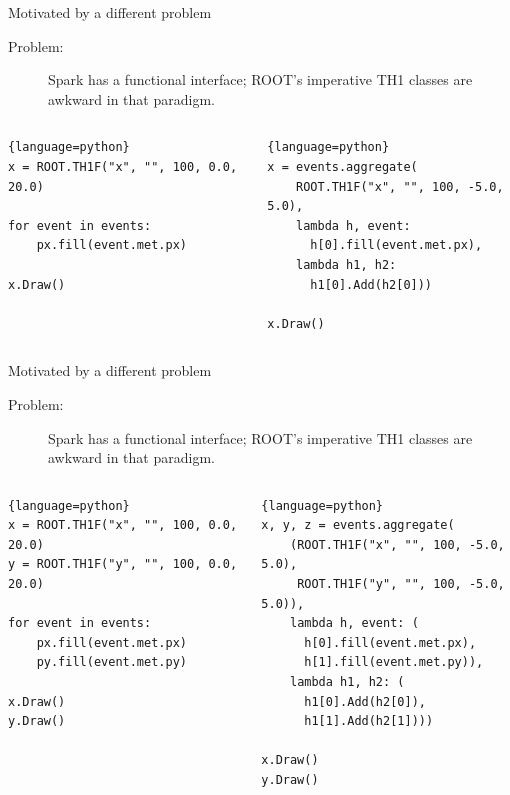 \documentclass{beamer}
\begin{document}



\begin{frame}[fragile]{Motivated by a different problem}
\begin{description}
\item[Problem:] Spark has a functional interface; ROOT's imperative TH1 classes are awkward in that paradigm.
\end{description}

\begin{columns}
\begin{lstlisting}{language=python}
x = ROOT.TH1F("x", "", 100, 0.0, 20.0)

for event in events:
    px.fill(event.met.px)

x.Draw()
\end{lstlisting}

\begin{lstlisting}{language=python}
x = events.aggregate(
    ROOT.TH1F("x", "", 100, -5.0, 5.0),
    lambda h, event:
      h[0].fill(event.met.px),
    lambda h1, h2:
      h1[0].Add(h2[0]))

x.Draw()
\end{lstlisting}
\end{columns}
\end{frame}

\begin{frame}[fragile]{Motivated by a different problem}
\begin{description}
\item[Problem:] Spark has a functional interface; ROOT's imperative TH1 classes are awkward in that paradigm.
\end{description}

\begin{columns}
\begin{lstlisting}{language=python}
x = ROOT.TH1F("x", "", 100, 0.0, 20.0)
y = ROOT.TH1F("y", "", 100, 0.0, 20.0)

for event in events:
    px.fill(event.met.px)
    py.fill(event.met.py)

x.Draw()
y.Draw()
\end{lstlisting}

\begin{lstlisting}{language=python}
x, y, z = events.aggregate(
    (ROOT.TH1F("x", "", 100, -5.0, 5.0),
     ROOT.TH1F("y", "", 100, -5.0, 5.0)),
    lambda h, event: (
      h[0].fill(event.met.px),
      h[1].fill(event.met.py)),
    lambda h1, h2: (
      h1[0].Add(h2[0]),
      h1[1].Add(h2[1])))

x.Draw()
y.Draw()
\end{lstlisting}
\end{columns}
\end{frame}
\end{document}
